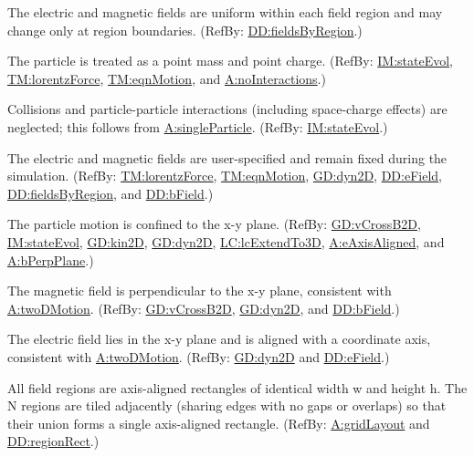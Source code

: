 \documentclass[12pt]{article}
\begin{document}
\begin{description}[font=\normalfont]
\item[piecewiseUniform:\phantomsection\label{piecewiseUniform}]{The electric and magnetic fields are uniform within each field region and may change only at region boundaries. (RefBy: \hyperref[DD:fieldsByRegion]{DD:fieldsByRegion}.)}
\item[singleParticle:\phantomsection\label{singleParticle}]{The particle is treated as a point mass and point charge. (RefBy: \hyperref[IM:stateEvol]{IM:stateEvol}, \hyperref[TM:lorentzForce]{TM:lorentzForce}, \hyperref[TM:eqnMotion]{TM:eqnMotion}, and \hyperref[noInteractions]{A:noInteractions}.)}
\item[noInteractions:\phantomsection\label{noInteractions}]{Collisions and particle-particle interactions (including space-charge effects) are neglected; this follows from \hyperref[singleParticle]{A:singleParticle}. (RefBy: \hyperref[IM:stateEvol]{IM:stateEvol}.)}
\item[prescribedFields:\phantomsection\label{prescribedFields}]{The electric and magnetic fields are user-specified and remain fixed during the simulation. (RefBy: \hyperref[TM:lorentzForce]{TM:lorentzForce}, \hyperref[TM:eqnMotion]{TM:eqnMotion}, \hyperref[GD:dyn2D]{GD:dyn2D}, \hyperref[DD:eField]{DD:eField}, \hyperref[DD:fieldsByRegion]{DD:fieldsByRegion}, and \hyperref[DD:bField]{DD:bField}.)}
\item[twoDMotion:\phantomsection\label{twoDMotion}]{The particle motion is confined to the x-y plane. (RefBy: \hyperref[GD:vCrossB2D]{GD:vCrossB2D}, \hyperref[IM:stateEvol]{IM:stateEvol}, \hyperref[GD:kin2D]{GD:kin2D}, \hyperref[GD:dyn2D]{GD:dyn2D}, \hyperref[lcExtendTo3D]{LC:lcExtendTo3D}, \hyperref[eAxisAligned]{A:eAxisAligned}, and \hyperref[bPerpPlane]{A:bPerpPlane}.)}
\item[bPerpPlane:\phantomsection\label{bPerpPlane}]{The magnetic field is perpendicular to the x-y plane, consistent with \hyperref[twoDMotion]{A:twoDMotion}. (RefBy: \hyperref[GD:vCrossB2D]{GD:vCrossB2D}, \hyperref[GD:dyn2D]{GD:dyn2D}, and \hyperref[DD:bField]{DD:bField}.)}
\item[eAxisAligned:\phantomsection\label{eAxisAligned}]{The electric field lies in the x-y plane and is aligned with a coordinate axis, consistent with \hyperref[twoDMotion]{A:twoDMotion}. (RefBy: \hyperref[GD:dyn2D]{GD:dyn2D} and \hyperref[DD:eField]{DD:eField}.)}
\item[rectRegions:\phantomsection\label{rectRegions}]{All field regions are axis-aligned rectangles of identical width w and height h. The N regions are tiled adjacently (sharing edges with no gaps or overlaps) so that their union forms a single axis-aligned rectangle. (RefBy: \hyperref[gridLayout]{A:gridLayout} and \hyperref[DD:regionRect]{DD:regionRect}.)}

\end{description}
\end{document}
